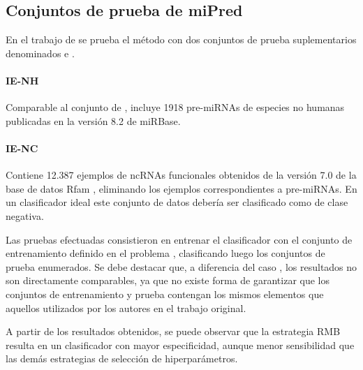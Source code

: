 %
%
\subsection{Conjuntos de prueba de miPred}
%
En el trabajo de \citeauthor{ng} \cite{ng} se prueba el método
\mipred{} con dos conjuntos de prueba suplementarios denominados
 e .
\paragraph{IE-NH}
Comparable al conjunto  de \cite{xue}, incluye
1918 pre-miRNAs de especies no humanas publicadas en la versión 8.2 de
miRBase.
\paragraph{IE-NC}
Contiene 12.387 ejemplos de ncRNAs funcionales obtenidos de la versión
7.0 de la base de datos Rfam \cite{rfam}, eliminando los ejemplos
correspondientes a pre-miRNAs. En un clasificador ideal este conjunto
de datos debería ser clasificado como de clase negativa.

Las pruebas efectuadas consistieron en entrenar el clasificador con el
conjunto de entrenamiento definido en el problema \mipred{},
clasificando luego los conjuntos de prueba enumerados.  Se debe
destacar que, a diferencia del caso \tripletsvm{}, los resultados no
son directamente comparables, ya que no existe forma de garantizar que
los conjuntos de entrenamiento y prueba contengan los mismos elementos
que aquellos utilizados por los autores en el trabajo original.

A partir de los resultados obtenidos, se puede observar que la estrategia
RMB resulta en un clasificador con mayor especificidad, aunque menor
sensibilidad que las demás estrategias de selección de hiperparámetros.
